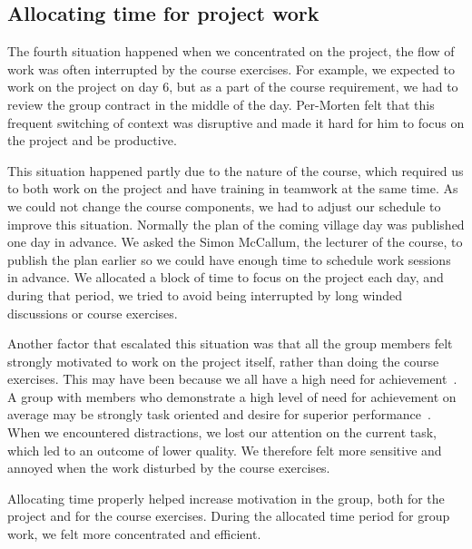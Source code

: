 \subsection{Allocating time for project work}
The fourth situation happened when we concentrated on the project, the flow of work was often interrupted by the course exercises. For example, we expected to work on the project on day 6, but as a part of the course requirement, we had to review the group contract in the middle of the day. Per-Morten felt that this frequent switching of context was disruptive and made it hard for him to focus on the project and be productive.

This situation happened partly due to the nature of the course, which required us to both work on the project and have training in teamwork at the same time. As we could not change the course components, we had to adjust our schedule to improve this situation. Normally the plan of the coming village day was published one day in advance. We asked the Simon McCallum, the lecturer of the course, to publish the plan earlier so we could have enough time to schedule work sessions in advance. We allocated a block of time to focus on the project each day, and during that period, we tried to avoid being interrupted by long winded discussions or course exercises.
 
Another factor that escalated this situation was that all the group members felt strongly motivated to work on the project itself, rather than doing the course exercises. This may have been because we all have a high need for achievement~\cite{2014chin_and_choi}. A group with members who demonstrate a high level of need for achievement on average may be strongly task oriented and desire for superior performance~\cite{2014chin_and_choi}. When we encountered distractions, we lost our attention on the current task, which led to an outcome of lower quality. We therefore felt more sensitive and annoyed when the work disturbed by the course exercises. 

Allocating time properly helped increase motivation in the group, both for the project and for the course exercises. During the allocated time period for group work, we felt more concentrated and efficient.
